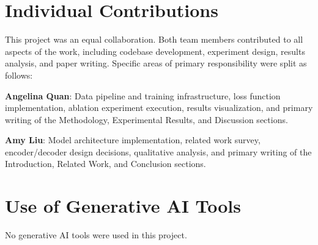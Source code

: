 \documentclass[10pt,twocolumn,letterpaper]{article}
\begin{document}
\section*{Individual Contributions}

This project was an equal collaboration. Both team members contributed to all aspects of the work, including codebase development, experiment design, results analysis, and paper writing. Specific areas of primary responsibility were split as follows:

\textbf{Angelina Quan}: Data pipeline and training infrastructure, loss function implementation, ablation experiment execution, results visualization, and primary writing of the Methodology, Experimental Results, and Discussion sections.

\textbf{Amy Liu}: Model architecture implementation, related work survey, encoder/decoder design decisions, qualitative analysis, and primary writing of the Introduction, Related Work, and Conclusion sections.

\section*{Use of Generative AI Tools}

No generative AI tools were used in this project.

{\small


}
\end{document}

